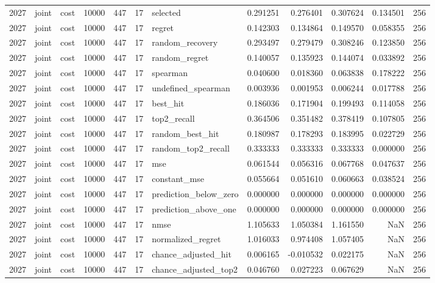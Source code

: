 \begin{tabular}{rllrrrlrrrrr}
2027 & joint & cost & 10000 & 447 & 17 & selected & 0.291251 & 0.276401 & 0.307624 & 0.134501 & 256 \\
2027 & joint & cost & 10000 & 447 & 17 & regret & 0.142303 & 0.134864 & 0.149570 & 0.058355 & 256 \\
2027 & joint & cost & 10000 & 447 & 17 & random_recovery & 0.293497 & 0.279479 & 0.308246 & 0.123850 & 256 \\
2027 & joint & cost & 10000 & 447 & 17 & random_regret & 0.140057 & 0.135923 & 0.144074 & 0.033892 & 256 \\
2027 & joint & cost & 10000 & 447 & 17 & spearman & 0.040600 & 0.018360 & 0.063838 & 0.178222 & 256 \\
2027 & joint & cost & 10000 & 447 & 17 & undefined_spearman & 0.003936 & 0.001953 & 0.006244 & 0.017788 & 256 \\
2027 & joint & cost & 10000 & 447 & 17 & best_hit & 0.186036 & 0.171904 & 0.199493 & 0.114058 & 256 \\
2027 & joint & cost & 10000 & 447 & 17 & top2_recall & 0.364506 & 0.351482 & 0.378419 & 0.107805 & 256 \\
2027 & joint & cost & 10000 & 447 & 17 & random_best_hit & 0.180987 & 0.178293 & 0.183995 & 0.022729 & 256 \\
2027 & joint & cost & 10000 & 447 & 17 & random_top2_recall & 0.333333 & 0.333333 & 0.333333 & 0.000000 & 256 \\
2027 & joint & cost & 10000 & 447 & 17 & mse & 0.061544 & 0.056316 & 0.067768 & 0.047637 & 256 \\
2027 & joint & cost & 10000 & 447 & 17 & constant_mse & 0.055664 & 0.051610 & 0.060663 & 0.038524 & 256 \\
2027 & joint & cost & 10000 & 447 & 17 & prediction_below_zero & 0.000000 & 0.000000 & 0.000000 & 0.000000 & 256 \\
2027 & joint & cost & 10000 & 447 & 17 & prediction_above_one & 0.000000 & 0.000000 & 0.000000 & 0.000000 & 256 \\
2027 & joint & cost & 10000 & 447 & 17 & nmse & 1.105633 & 1.050384 & 1.161550 & NaN & 256 \\
2027 & joint & cost & 10000 & 447 & 17 & normalized_regret & 1.016033 & 0.974408 & 1.057405 & NaN & 256 \\
2027 & joint & cost & 10000 & 447 & 17 & chance_adjusted_hit & 0.006165 & -0.010532 & 0.022175 & NaN & 256 \\
2027 & joint & cost & 10000 & 447 & 17 & chance_adjusted_top2 & 0.046760 & 0.027223 & 0.067629 & NaN & 256 \\

\end{tabular}
